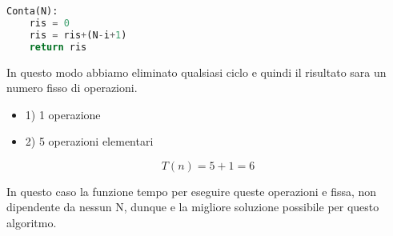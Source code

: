 \begin{lstlisting}[language=Python]
Conta(N):
	ris = 0
	ris = ris+(N-i+1)
	return ris
\end{lstlisting}

In questo modo abbiamo eliminato qualsiasi ciclo e quindi il risultato sara un numero fisso di operazioni.

\begin{itemize}
\item 1) 1 operazione
\item 2) 5 operazioni elementari
\end{itemize}

$$T(n) = 5+1 = 6$$

In questo caso la funzione tempo per eseguire queste operazioni e fissa, non dipendente da nessun N, dunque e la migliore soluzione possibile per questo algoritmo.

